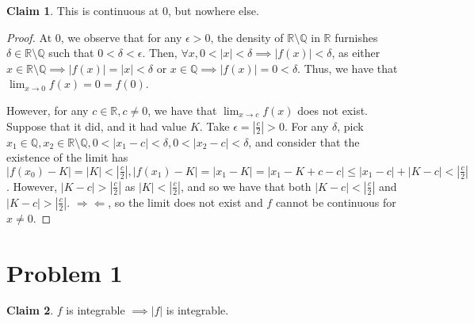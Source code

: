\documentclass[12pt,letterpaper]{article}
\theoremstyle{definition}
\newtheorem*{claim}{Claim}
\newcommand{\contra}{\Rightarrow\!\Leftarrow}
\newcommand{\R}{\mathbb{R}}
\newcommand{\Q}{\mathbb{Q}}
\begin{document}
\begin{claim}
  This is continuous at 0, but nowhere else.
\end{claim}

\begin{proof}
  At 0, we observe that for any $\epsilon > 0$, the density of $\R \setminus \Q$
  in $\R$ furnishes $\delta \in \R \setminus \Q$ such that $0 < \delta <
  \epsilon$. Then, $\forall x, 0 < |x| < \delta \implies |f(x)| < \delta$, as
  either $x \in \R \setminus \Q \implies |f(x)| = |x| < \delta$ or $x \in \Q
  \implies |f(x)| = 0 < \delta$. Thus, we have that $\lim_{x\rightarrow 0}f(x) =
  0 = f(0)$.

  However, for any $c \in \R, c \neq 0$, we have that $\lim_{x\rightarrow
    c}f(x)$ does not exist. Suppose that it did, and it had value $K$. Take
  $\epsilon = |\frac{c}{2}| > 0$. For any
  $\delta$, pick $x_1 \in \Q, x_2 \in \R \setminus \Q, 0 < |x_1 - c| <\delta, 0
  < |x_2 - c| < \delta$, and consider that the
  existence of the limit has $|f(x_0) - K| = |K| < |\frac{c}{2}|, |f(x_1) - K| =
  |x_1 - K| = |x_1 - K + c - c| \leq |x_1 - c| + |K - c| < |\frac{c}{2}|$.
  However, $|K - c| > |\frac{c}{2}|$ as $|K| < |\frac{c}{2}|$, and so we have
  that both $|K -c| < |\frac{c}{2}|$ and $|K -c| > |\frac{c}{2}|$. $\contra$, so
  the limit does not exist and $f$ cannot be continuous for $x \neq 0$.
\end{proof}

\section*{Problem 1}

\begin{claim}
  $f$ is integrable $\implies |f|$ is integrable.
\end{claim}
\end{document}
